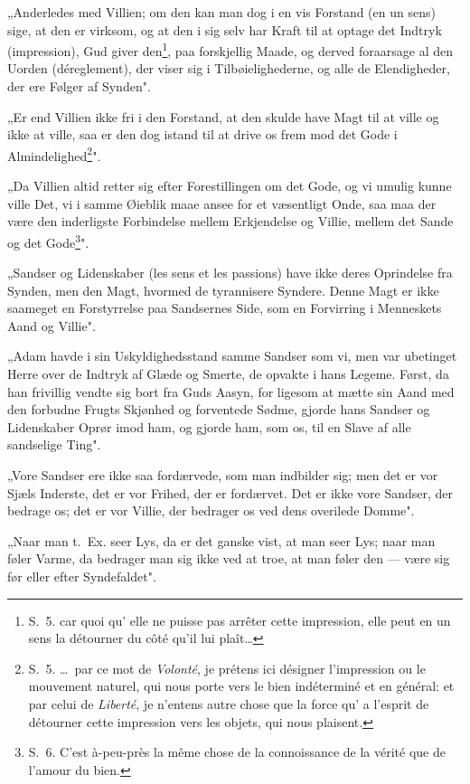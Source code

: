 \documentclass[12pt,a4paper]{article}
\newcommand{\opage}[1]{\marginnote{\footnotesize\textit{[#1]}}}
\begin{document}
„Anderledes med Villien; om den kan man dog i en vis Forstand (en
un sens) sige, at den er virksom, og at den i sig selv har Kraft til at
\opage{8} optage det Indtryk (impression), Gud giver den\footnote{S.~5. car quoi qu' elle
ne puisse pas arrêter cette impression, elle peut en un sens la détourner du
côté qu'il lui plaît\dots}, paa forskjellig Maade,
og derved foraarsage al den Uorden (déreglement), der viser sig i
Tilbøielighederne, og alle de Elendigheder, der ere Følger af Synden".

„Er end Villien ikke fri i den Forstand, at den skulde have Magt til
at ville og ikke at ville, saa er den dog istand til at drive os frem mod det
Gode i Almindelighed\footnote{S.~5. \dots\ par ce mot de \emph{Volonté}, je
prétens ici désigner l'impression ou le mouvement naturel, qui nous porte vers
le bien indéterminé et en général: et par celui de \emph{Liberté}, je n'entens
autre chose que la force qu' a l'esprit de détourner cette impression vers les
objets, qui nous plaisent.}".

„Da Villien altid retter sig efter Forestillingen om det Gode, og vi
umulig kunne ville Det, vi i samme Øieblik maae ansee for et væsentligt
Onde, saa maa der være den inderligste Forbindelse mellem Erkjendelse og
Villie, mellem det Sande og det Gode\footnote{S.~6. C'est à-peu-près la même
chose de la connoissance de la vérité que de l'amour du bien.}".

„Sandser og Lidenskaber (les sens et les passions) have ikke deres
Oprindelse fra Synden, men den Magt, hvormed de tyrannisere Syndere.
Denne Magt er ikke saameget en Forstyrrelse paa Sandsernes Side, som en
Forvirring i Menneskets Aand og Villie".

„Adam havde i sin Uskyldighedsstand samme Sandser som vi, men
var ubetinget Herre over de Indtryk af Glæde og Smerte, de opvakte i hans
Legeme. Først, da han frivillig vendte sig bort fra Guds Aasyn, for ligesom
at mætte sin Aand med den forbudne Frugts Skjønhed og forventede Sødme,
gjorde hans Sandser og Lidenskaber Oprør imod ham, og gjorde ham, som
os, til en Slave af alle sandselige Ting".

„Vore Sandser ere ikke saa fordærvede, som man indbilder sig; men
det er vor Sjæls Inderste, det er vor Frihed, der er fordærvet. Det er
\opage{9} ikke vore Sandser, der bedrage os; det er vor Villie, der bedrager os ved
dens overilede Domme".

„Naar man t.~Ex. seer Lys, da er det ganske vist, at man seer Lys;
naar man føler Varme, da bedrager man sig ikke ved at troe, at man føler
den --- være sig før eller efter Syndefaldet".
\end{document}
